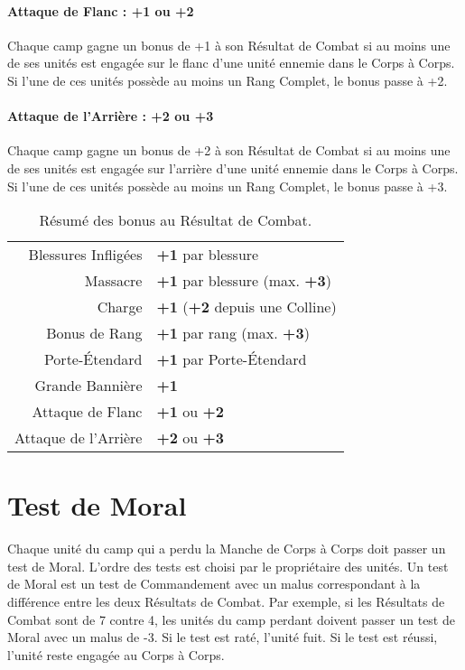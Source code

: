 \paragraph{Attaque de Flanc : +1 ou +2}

Chaque camp gagne un bonus de +1 à son Résultat de Combat si au moins une de ses unités est engagée sur le flanc d'une unité ennemie dans le Corps à Corps. Si l'une de ces unités possède au moins un Rang Complet, le bonus passe à +2.

\paragraph{Attaque de l'Arrière : +2 ou +3}

Chaque camp gagne un bonus de +2 à son Résultat de Combat si au moins une de ses unités est engagée sur l'arrière d'une unité ennemie dans le Corps à Corps. Si l'une de ces unités possède au moins un Rang Complet, le bonus passe à +3.

\begin{table}[!htbp]
\centering
\begin{tabular}{rl}
\hline
Blessures Infligées & \textbf{+1} par blessure \tabularnewline
Massacre & \textbf{+1} par blessure (max. \textbf{+3}) \tabularnewline
Charge & \textbf{+1} (\textbf{+2} depuis une Colline) \tabularnewline
Bonus de Rang & \textbf{+1} par rang (max. \textbf{+3}) \tabularnewline
Porte-Étendard & \textbf{+1} par Porte-Étendard \tabularnewline
Grande Bannière & \textbf{+1} \tabularnewline
Attaque de Flanc & \textbf{+1} ou \textbf{+2} \tabularnewline
Attaque de l'Arrière & \textbf{+2} ou \textbf{+3} \tabularnewline
\hline
\end{tabular}
\caption{Résumé des bonus au Résultat de Combat.}
\label{table/combat_score}
\end{table}

\hypertarget{breaktest}{\section{Test de Moral}}
\label{break_test}

Chaque unité du camp qui a perdu la Manche de Corps à Corps doit passer un test de Moral. L'ordre des tests est choisi par le propriétaire des unités. Un test de Moral est un test de Commandement avec un malus correspondant à la différence entre les deux Résultats de Combat. Par exemple, si les Résultats de Combat sont de 7 contre 4, les unités du camp perdant doivent passer un test de Moral avec un malus de -3. Si le test est raté, l'unité fuit. Si le test est réussi, l'unité reste engagée au Corps à Corps.

